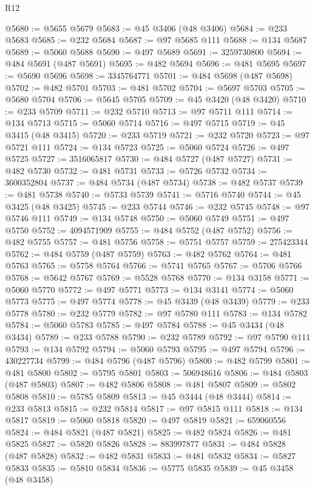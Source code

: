 \begin{lexlean}{R12}
\begin{coremodule}
{{{{{{{{{{{{{{{{{{{{{{{{{{{{{{{{{{{{{{{{{{{{{{{{{{{{{{{{{{{{{{{{{{{{{{{{{{{{{{{{{{@5680 := @5655 @5679
@5683 := @45 @3406 (@48 @3406)
@5684 := @233 @5683
@5685 := @232 @5684
@5687 := @97 @5685 @111
@5688 := @134 @5687
@5689 := @5060 @5688
@5690 := @497 @5689
@5691 := 3259730800
@5694 := @484 @5691 (@487 @5691)
@5695 := @482 @5694
@5696 := @481 @5695
@5697 := @5690 @5696
@5698 := 3345764771
@5701 := @484 @5698 (@487 @5698)
@5702 := @482 @5701
@5703 := @481 @5702
@5704 := @5697 @5703
@5705 := @5680 @5704
@5706 := @5645 @5705
@5709 := @45 @3420 (@48 @3420)
@5710 := @233 @5709
@5711 := @232 @5710
@5713 := @97 @5711 @111
@5714 := @134 @5713
@5715 := @5060 @5714
@5716 := @497 @5715
@5719 := @45 @3415 (@48 @3415)
@5720 := @233 @5719
@5721 := @232 @5720
@5723 := @97 @5721 @111
@5724 := @134 @5723
@5725 := @5060 @5724
@5726 := @497 @5725
@5727 := 3516065817
@5730 := @484 @5727 (@487 @5727)
@5731 := @482 @5730
@5732 := @481 @5731
@5733 := @5726 @5732
@5734 := 3600352804
@5737 := @484 @5734 (@487 @5734)
@5738 := @482 @5737
@5739 := @481 @5738
@5740 := @5733 @5739
@5741 := @5716 @5740
@5744 := @45 @3425 (@48 @3425)
@5745 := @233 @5744
@5746 := @232 @5745
@5748 := @97 @5746 @111
@5749 := @134 @5748
@5750 := @5060 @5749
@5751 := @497 @5750
@5752 := 4094571909
@5755 := @484 @5752 (@487 @5752)
@5756 := @482 @5755
@5757 := @481 @5756
@5758 := @5751 @5757
@5759 := 275423344
@5762 := @484 @5759 (@487 @5759)
@5763 := @482 @5762
@5764 := @481 @5763
@5765 := @5758 @5764
@5766 := @5741 @5765
@5767 := @5706 @5766
@5768 := @5642 @5767
@5769 := @5528 @5768
@5770 := @134 @3158
@5771 := @5060 @5770
@5772 := @497 @5771
@5773 := @134 @3141
@5774 := @5060 @5773
@5775 := @497 @5774
@5778 := @45 @3439 (@48 @3439)
@5779 := @233 @5778
@5780 := @232 @5779
@5782 := @97 @5780 @111
@5783 := @134 @5782
@5784 := @5060 @5783
@5785 := @497 @5784
@5788 := @45 @3434 (@48 @3434)
@5789 := @233 @5788
@5790 := @232 @5789
@5792 := @97 @5790 @111
@5793 := @134 @5792
@5794 := @5060 @5793
@5795 := @497 @5794
@5796 := 430227734
@5799 := @484 @5796 (@487 @5796)
@5800 := @482 @5799
@5801 := @481 @5800
@5802 := @5795 @5801
@5803 := 506948616
@5806 := @484 @5803 (@487 @5803)
@5807 := @482 @5806
@5808 := @481 @5807
@5809 := @5802 @5808
@5810 := @5785 @5809
@5813 := @45 @3444 (@48 @3444)
@5814 := @233 @5813
@5815 := @232 @5814
@5817 := @97 @5815 @111
@5818 := @134 @5817
@5819 := @5060 @5818
@5820 := @497 @5819
@5821 := 659060556
@5824 := @484 @5821 (@487 @5821)
@5825 := @482 @5824
@5826 := @481 @5825
@5827 := @5820 @5826
@5828 := 883997877
@5831 := @484 @5828 (@487 @5828)
@5832 := @482 @5831
@5833 := @481 @5832
@5834 := @5827 @5833
@5835 := @5810 @5834
@5836 := @5775 @5835
@5839 := @45 @3458 (@48 @3458)
}}}}}}}}}}}}}}}}}}}}}}}}}}}}}}}}}}}}}}}}}}}}}}}}}}}}}}}}}}}}}}}}}}}}}}}}}}}}}}}}}}
\end{coremodule}
\end{lexlean}

